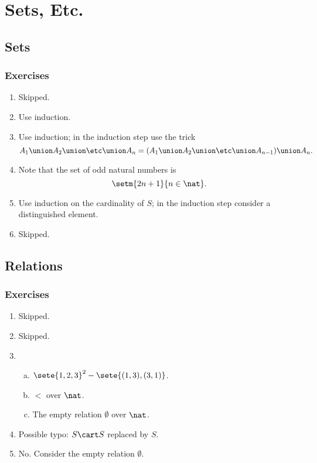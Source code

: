 \setcounter{chapter}{1}
\chapter{Sets, Etc.}
\section{Sets}
\subsection*{Exercises}
\begin{enumerate}[\thesection-1]
%
\item Skipped.
%
\item Use induction.
%
\item Use induction; in the induction step use the trick
\[
A_1 \union A_2 \union \etc \union A_n = (A_1 \union A_2 \union \etc \union A_{n - 1}) \union A_n.
\]
%
\item Note that the set of odd natural numbers is
\[
\setm{2n + 1}{n \in \nat}.
\]
%
\item Use induction on the cardinality of $S$; in the induction step consider a distinguished element.
%
\item Skipped.
%
\end{enumerate}

\section{Relations}
\subsection*{Exercises}
\begin{enumerate}[\thesection-1]
%
\item Skipped.
%
\item Skipped.
%
\item \begin{enumerate}[a.]
\item $\sete{1, 2, 3}^2 - \sete{(1, 3), (3, 1)}$.
\item $<$ over $\nat$.
\item The empty relation $\emptyset$ over $\nat$.
\end{enumerate}
%
\item Possible typo: $S \cart S$ replaced by $S$.
%
\item No. Consider the empty relation $\emptyset$.
%
\end{enumerate}

